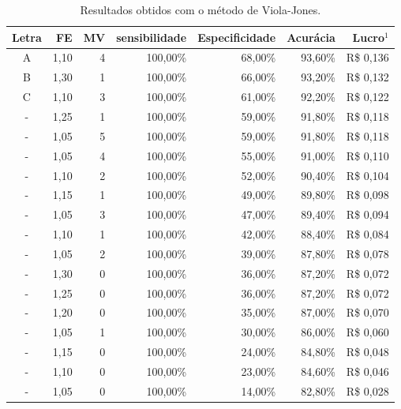 \begin{table}[htbp]
    \caption{Resultados obtidos com o método de Viola-Jones.}
    \label{tab:results_identify}
    \centering
    \begin{tabular}{crrrrrr}
        \hline\hline
        Letra & FE   & MV & sensibilidade & Especificidade & Acurácia & Lucro$^1$  \\
        \hline
        A     & 1,10 & 4  & 100,00\%      & 68,00\%        & 93,60\%  & R\$ 0,136  \\
        B     & 1,30 & 1  & 100,00\%      & 66,00\%        & 93,20\%  & R\$ 0,132  \\
        C     & 1,10 & 3  & 100,00\%      & 61,00\%        & 92,20\%  & R\$ 0,122  \\
        -     & 1,25 & 1  & 100,00\%      & 59,00\%        & 91,80\%  & R\$ 0,118  \\
        -     & 1,05 & 5  & 100,00\%      & 59,00\%        & 91,80\%  & R\$ 0,118  \\
        -     & 1,05 & 4  & 100,00\%      & 55,00\%        & 91,00\%  & R\$ 0,110  \\
        -     & 1,10 & 2  & 100,00\%      & 52,00\%        & 90,40\%  & R\$ 0,104  \\
        -     & 1,15 & 1  & 100,00\%      & 49,00\%        & 89,80\%  & R\$ 0,098  \\
        -     & 1,05 & 3  & 100,00\%      & 47,00\%        & 89,40\%  & R\$ 0,094  \\
        -     & 1,10 & 1  & 100,00\%      & 42,00\%        & 88,40\%  & R\$ 0,084  \\
        -     & 1,05 & 2  & 100,00\%      & 39,00\%        & 87,80\%  & R\$ 0,078  \\
        -     & 1,30 & 0  & 100,00\%      & 36,00\%        & 87,20\%  & R\$ 0,072  \\
        -     & 1,25 & 0  & 100,00\%      & 36,00\%        & 87,20\%  & R\$ 0,072  \\
        -     & 1,20 & 0  & 100,00\%      & 35,00\%        & 87,00\%  & R\$ 0,070  \\
        -     & 1,05 & 1  & 100,00\%      & 30,00\%        & 86,00\%  & R\$ 0,060  \\
        -     & 1,15 & 0  & 100,00\%      & 24,00\%        & 84,80\%  & R\$ 0,048  \\
        -     & 1,10 & 0  & 100,00\%      & 23,00\%        & 84,60\%  & R\$ 0,046  \\
        -     & 1,05 & 0  & 100,00\%      & 14,00\%        & 82,80\%  & R\$ 0,028  \\

\end{tabular}
\end{table}
